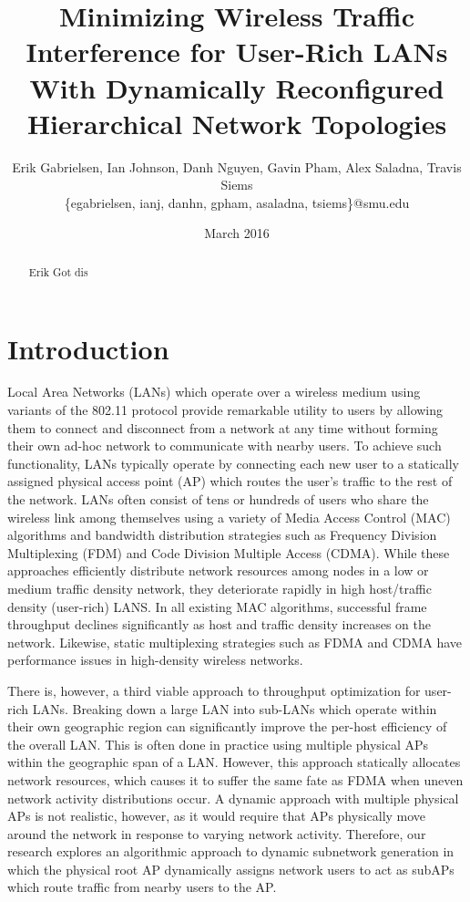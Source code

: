 \documentclass{sigcomm-alternate}
\title{Minimizing Wireless Traffic Interference for User-Rich LANs With Dynamically Reconfigured Hierarchical Network Topologies}
\author{Erik Gabrielsen, Ian Johnson, Danh Nguyen, Gavin Pham, Alex Saladna, Travis Siems\\ \{egabrielsen, ianj, danhn, gpham, asaladna, tsiems\}@smu.edu}
\date{March 2016}
\begin{document}
\maketitle

\begin{abstract}
Erik Got dis 
\end{abstract}

\section{Introduction}
Local Area Networks (LANs) which operate over a wireless medium using variants of the 802.11 protocol provide remarkable utility to users by allowing them to connect and disconnect from a network at any time without forming their own ad-hoc network to communicate with nearby users. To achieve such functionality, LANs typically operate by connecting each new user to a statically assigned physical access point (AP) which routes the user's traffic to the rest of the network. LANs often consist of tens or hundreds of users who share the wireless link among themselves using a variety of Media Access Control (MAC) algorithms and bandwidth distribution strategies such as Frequency Division Multiplexing (FDM) and Code Division Multiple Access (CDMA). While these approaches efficiently distribute network resources among nodes in a low or medium traffic density network, they deteriorate rapidly in high host/traffic density (user-rich) LANS. In all existing MAC algorithms, successful frame throughput declines significantly as host and traffic density increases on the network. Likewise, static multiplexing strategies such as FDMA and CDMA have performance issues in high-density wireless networks. 

There is, however, a third viable approach to throughput optimization for user-rich LANs. Breaking down a large LAN into sub-LANs which operate within their own geographic region can significantly improve the per-host efficiency of the overall LAN. This is often done in practice using multiple physical APs within the geographic span of a LAN. However, this approach statically allocates network resources, which causes it to suffer the same fate as FDMA when uneven network activity distributions occur. A dynamic approach with multiple physical APs is not realistic, however, as it would require that APs physically move around the network in response to varying network activity. Therefore, our research explores an algorithmic approach to dynamic subnetwork generation in which the physical root AP dynamically assigns network users to act as subAPs which route traffic from nearby users to the AP. 
\end{document}
